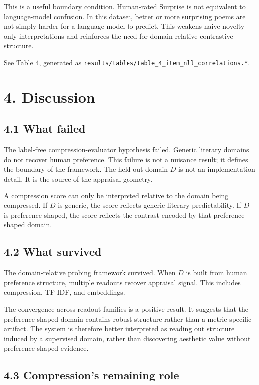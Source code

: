 \documentclass[11pt]{article}
\begin{document}
This is a useful boundary condition. Human-rated Surprise is not equivalent to language-model confusion. In this dataset, better or more surprising poems are not simply harder for a language model to predict. This weakens naive novelty-only interpretations and reinforces the need for domain-relative contrastive structure.

See Table 4, generated as \texttt{results/tables/table\_4\_item\_nll\_correlations.*}.

\section{4. Discussion}

\subsection{4.1 What failed}

The label-free compression-evaluator hypothesis failed. Generic literary domains do not recover human preference. This failure is not a nuisance result; it defines the boundary of the framework. The held-out domain \(D\) is not an implementation detail. It is the source of the appraisal geometry.

A compression score can only be interpreted relative to the domain being compressed. If \(D\) is generic, the score reflects generic literary predictability. If \(D\) is preference-shaped, the score reflects the contrast encoded by that preference-shaped domain.

\subsection{4.2 What survived}

The domain-relative probing framework survived. When \(D\) is built from human preference structure, multiple readouts recover appraisal signal. This includes compression, TF-IDF, and embeddings.

The convergence across readout families is a positive result. It suggests that the preference-shaped domain contains robust structure rather than a metric-specific artifact. The system is therefore better interpreted as reading out structure induced by a supervised domain, rather than discovering aesthetic value without preference-shaped evidence.

\subsection{4.3 Compression’s remaining role}
\end{document}
